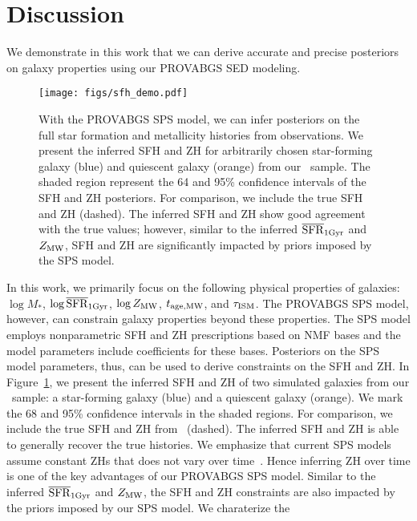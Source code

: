 \section{Discussion} \label{sec:discuss}
We demonstrate in this work that we can derive accurate and precise posteriors
on galaxy properties using our {\sc PROVABGS} SED modeling. 




\begin{figure}
\begin{center}
\texttt{[image: figs/sfh\_demo.pdf]}
    \caption{
        With the {\sc PROVABGS} SPS model, we can infer posteriors on the full
        star formation and metallicity histories from observations. 
        We present the inferred SFH and ZH for arbitrarily chosen star-forming
        galaxy (blue) and quiescent galaxy (orange) from our \lgal~sample.
        The shaded region represent the 64 and 95\% confidence intervals of the
        SFH and ZH posteriors. 
        For comparison, we include the true SFH and ZH (dashed). 
        The inferred SFH and ZH show good agreement with the true values;
        however, similar to the inferred $\overline{\rm SFR}_{\rm 1Gyr}$ and $Z_{\rm MW}$, SFH and ZH are
        significantly impacted by priors imposed by the SPS model. 
    } \label{fig:sfh_demo}
\end{center}
\end{figure}


In this work, we primarily focus on the following physical properties of
galaxies: $\log M_*$, $\log\overline{\rm SFR}_{\rm 1Gyr}$, $\log Z_{\rm MW}$, $t_{\rm age, MW}$, and $\tau_{\rm ISM}$. 
The {\sc PROVABGS} SPS model, however, can constrain galaxy properties beyond
these properties. 
The SPS model employs nonparametric SFH and ZH prescriptions based on NMF bases
and the model parameters include coefficients for these bases. 
Posteriors on the SPS model parameters, thus, can be used to derive constraints
on the SFH and ZH. 
In Figure~\ref{fig:sfh_demo}, we present the inferred SFH and ZH of two
simulated galaxies from our \lgal~sample: a star-forming galaxy (blue) and a
quiescent galaxy (orange). 
We mark the 68 and 95\% confidence intervals in the shaded regions. 
For comparison, we include the true SFH and ZH from \lgal~(dashed).  
The inferred SFH and ZH is able to generally recover the true histories. 
We emphasize that current SPS models assume constant ZHs that does not vary
over time~\citep{carnall2017, leja2019}. 
Hence inferring ZH over time is one of the key advantages of our {\sc PROVABGS}
SPS model. 
Similar to the inferred $\overline{\rm SFR}_{\rm 1Gyr}$ and $Z_{\rm MW}$, the SFH and ZH constraints are
also impacted by the priors imposed by our SPS model. 
We charaterize the  

